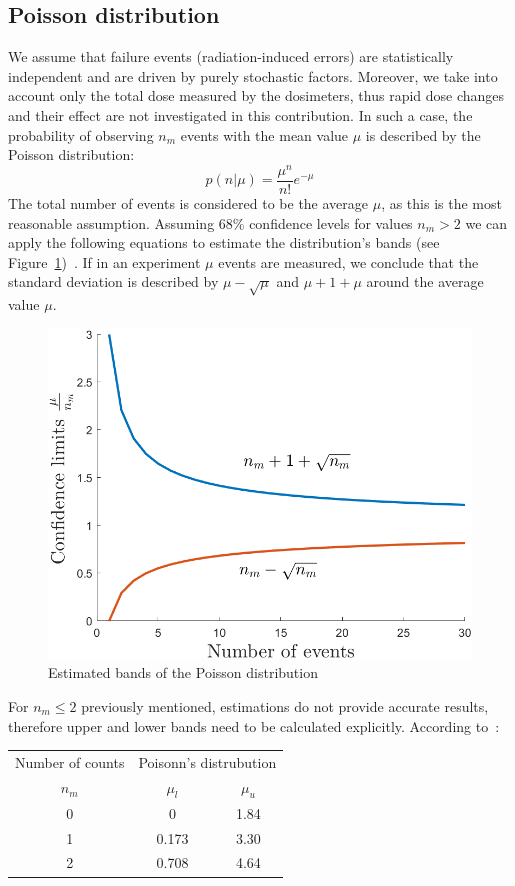 \subsection{Poisson distribution}
We assume that failure events (radiation-induced errors) are statistically independent and are driven by purely stochastic factors. Moreover, we take into account only the total dose measured by the dosimeters, thus rapid dose changes and their effect are not investigated in this contribution. In such a case, the probability of observing $n_{m}$ events with the mean value $\mu$ is described by the Poisson distribution:\newline
\begin{equation}
    p(n|\mu) = \frac{\mu^{n}}{n!}e^{-\mu}
\end{equation}
The total number of events is considered to be the average $\mu$, as this is the most reasonable assumption.
Assuming 68\% confidence levels for values $n_{m} > 2$ we can apply the following equations to estimate the distribution's bands (see Figure~\ref{fig:poisson})~\cite{schmidt}.
If in an experiment $\mu$ events are measured, we conclude that the standard deviation is described by $\mu - \sqrt{\mu}$ and $\mu + 1 + \mu$ around the average value $\mu$.
\begin{figure}[!h]
    \centering
    \includegraphics[width=0.55\columnwidth]{Chapter3/Irradiation/images/poisson.png}
    \caption{Estimated bands of the Poisson distribution~\cite{schmidt}}
    \label{fig:poisson}
\end{figure}
For $n_{m} \leq 2$ previously mentioned, estimations do not provide accurate results, therefore upper and lower bands need to be calculated explicitly. According to~\cite{schmidt}:



\begin{table}[!h]
\centering
\begin{tabular}{ccc}
\hline
Number of counts & \multicolumn{2}{c}{Poisonn's distrubution} \\ \cline{2-3} 
$n_{m}$          & $\mu_{l}$            & $\mu_{u}$           \\ \hline
0                & 0                    & 1.84                \\
1                & 0.173                & 3.30                \\
2                & 0.708                & 4.64                \\ \hline
\end{tabular}

\end{table}
\newpage
